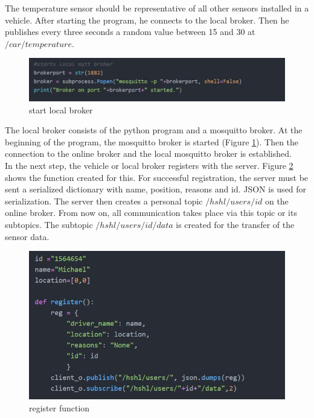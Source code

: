 The temperature sensor should be representative of all other sensors installed in a vehicle. After starting the program, he connects to the local broker. Then he publishes every three seconds a random value between 15 and 30 at $/car/temperature$.\\


\begin{figure}
\sidecaption
\includegraphics[scale=.5]{images/images_michael/local_broker_start.JPG}
\caption{start local broker}
\label{fig:start_broker}
\end{figure}
 
 The local broker consists of the python program and a mosquitto broker. At the beginning of the program, the mosquitto broker is started (Figure \ref{fig:start_broker}). Then the connection to the online broker and the local mosquitto broker is established. \\
 
 
 In the next step, the vehicle or local broker registers with the server. Figure \ref{fig:register} shows the function created for this. For successful registration, the server must be sent a serialized dictionary with name, position, reasons and id. JSON is used for serialization. The server then creates a personal topic $/hshl/users/id$ on the online broker. From now on, all communication takes place via this topic or its subtopics. The subtopic $/hshl/users/id/data$ is created for the transfer of the sensor data.\\
 
 
\begin{figure}
\sidecaption
\includegraphics[scale=.5]{images/images_michael/register_function.JPG}
\caption{register function}
\label{fig:register}
\end{figure}

